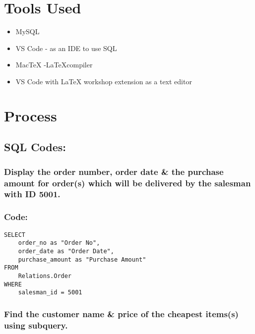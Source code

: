 \documentclass[12pt]{article}
\title{}
\author{}
\date{}
\begin{document}

\pagebreak

\tableofcontents

\maketitle

\section{Tools Used}
\begin{itemize}
    \item MySQL
    \item VS Code - as an IDE to use SQL
    \item MacTeX -\LaTeX  compiler
    \item VS Code with LaTeX workshop extension as a text editor
\end{itemize}


\section{Process}

\subsection*{SQL Codes:}
\subsubsection{Display the order number, order date \& the purchase amount for order(s) which will be delivered by the salesman with ID 5001.}
\subsubsection*{Code:}
\begin{verbatim}
SELECT
    order_no as "Order No",
    order_date as "Order Date",
    purchase_amount as "Purchase Amount"
FROM
    Relations.Order
WHERE
    salesman_id = 5001
\end{verbatim}
\vspace{10mm}

\subsubsection{Find the customer name \& price of the cheapest items(s) using subquery.}
\end{document}
